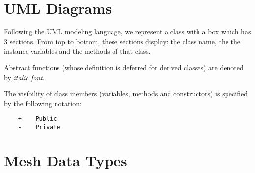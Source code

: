 \documentclass[11pt,article]{article}
\begin{document}

\newcommand{\NV}{NV}
\newcommand{\SD}{SD}
\newcommand{\abstractF}[1]{\textit{#1}} %

\section{UML Diagrams}

Following the UML modeling language, we represent a class with a box
which has 3 sections. From top to bottom, these sections display: the
class name, the the instance variables and the methods of that class.

Abstract functions (whose definition is deferred for derived classes)
are denoted by \textit{italic font}.

The visibility of class members (variables, methods and constructors)
is specified by the following notation:
\begin{verbatim}
    +    Public
    -    Private
\end{verbatim}

\section{Mesh Data Types}

\end{document}
